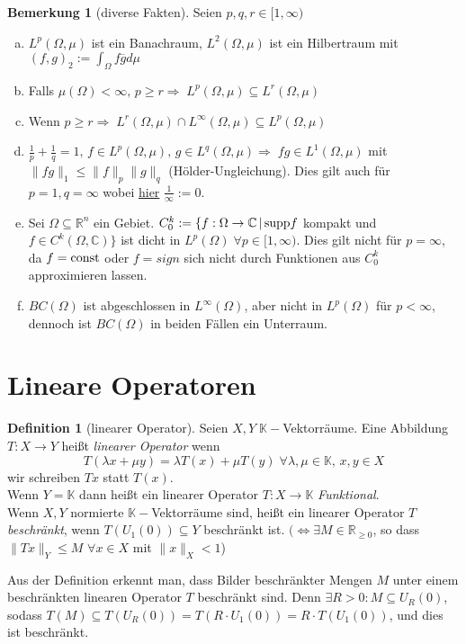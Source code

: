 \documentclass[ngerman]{report}
\theoremstyle{plain}%
\theoremstyle{definition}%
\newtheorem{definition}[thm]{Definition}
\theoremstyle{myStyle}
\newtheorem{bem}[thm]{Bemerkung}
\newcommand{\C}{\mathbb{C}}
\newcommand{\R}{\mathbb{R}}
\newcommand{\pR}{\mathbb{R}_{\geq 0}} %
\newcommand{\K}{\mathbb{K}}
\newcommand{\supp}{\textnormal{supp}}
\newcommand{\norm}[1]{\|#1\|}
\begin{document}
\begin{bem}[diverse Fakten]
	Seien $p,q,r\in [1,\infty)$
	\begin{enumerate}[(a)]
		\item $L^p(\Omega,\mu)$ ist ein Banachraum, $L^2(\Omega,\mu)$ ist ein Hilbertraum mit $(f,g)_2 := \int_\Omega f \overline{g} d\mu$
		
		\item Falls $\mu(\Omega) < \infty,\, p\geq r \Rightarrow\; L^p(\Omega,\mu)\subseteq L^r(\Omega,\mu)$
		
		\item Wenn $p\geq r\Rightarrow\; L^r(\Omega,\mu)\cap L^\infty(\Omega,\mu)\subseteq L^p(\Omega,\mu)$
		
		\item $\frac{1}{p}+\frac{1}{q}=1,\,f\in L^p(\Omega,\mu),\,g\in L^q(\Omega,\mu)\Rightarrow\;fg\in 		 L^1(\Omega,\mu)$ mit $\norm{fg}_1\leq\norm{f}_p\norm{g}_q$ (Hölder-Ungleichung). Dies gilt auch für $p=1, q=\infty$ wobei \underline{hier} $\frac{1}{\infty}:=0$.
		
		\item Sei $\Omega\subseteq \R^n$ ein Gebiet. $C^k_0:=\{f:\Omega \rightarrow \C\,|\, \supp f$ kompakt und $f\in C^k(\Omega,\C)\}$ ist dicht in $L^p(\Omega)\;\forall p\in[1,\infty)$. Dies gilt nicht für $p=\infty$, da $f=\textnormal{const}$ oder $f=sign$ sich nicht durch Funktionen aus $C^k_0$ approximieren lassen.
		
		\item $BC(\Omega)$ ist abgeschlossen in $L^\infty (\Omega)$, aber nicht in $L^p(\Omega)$ für $p<\infty$, dennoch ist $BC(\Omega)$ in beiden Fällen ein Unterraum.
	\end{enumerate}
\end{bem}



\section{Lineare Operatoren}

	\begin{definition}[linearer Operator]
		Seien $X,Y\; \K-$Vektorräume. Eine Abbildung $T:X\rightarrow Y$ heißt \textit{linearer Operator} wenn 
		$$T(\lambda x+\mu y) = \lambda T(x) + \mu T(y)\;\forall \lambda,\mu \in \K,\,x,y\in X$$ 
		wir schreiben $Tx$ statt $T(x)$.\\
		Wenn $Y=\K$ dann heißt ein linearer Operator $T:X\rightarrow \K$\textit{ Funktional}.\\
		Wenn $X,Y$ normierte $\K-$Vektorräume sind, heißt ein linearer Operator $T$ \textit{beschränkt}, wenn $T(U_1(0)) \subseteq Y$ beschränkt ist. 
		$(\Leftrightarrow \exists M \in \pR$, so dass $\norm{Tx}_Y \leq M$ $\forall x\in X$ mit $\norm{x}_X < 1$)
	\end{definition}
Aus der Definition erkennt man, dass Bilder beschränkter Mengen $M$ unter einem beschränkten linearen Operator $T$ beschränkt sind. Denn $\exists R>0: M \subseteq  U_R(0)$, sodass $T(M) \subseteq T(U_R(0))=T(R\cdot U_1(0))=R\cdot T(U_1(0))$, und dies ist beschränkt.
\end{document}
